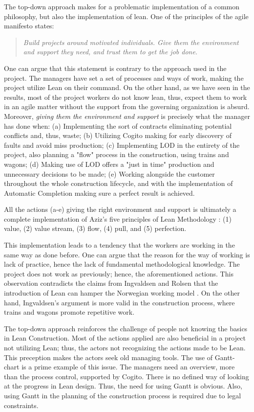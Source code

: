 The top-down approach makes for a problematic implementation of a common philosophy, but also the implementation of lean. One of the principles of the agile manifesto \citep{agile_manifesto} states:

\begin{quote}
    \textit{Build projects around motivated individuals. Give them the environment and support they need, and trust them to get the job done.}
\end{quote}
    
One can argue that this statement is contrary to the approach used in the project. The managers have set a set of processes and ways of work, making the project utilize Lean on their command.  On the other hand, as we have seen in the results, most of the project workers do not know lean, thus, expect them to work in an agile matter without the support from the governing organization is absurd. Moreover, \textit{giving them the environment and support} is precisely what the manager has done when: (a) Implementing the sort of contracts eliminating potential conflicts and, thus, waste; (b) Utilizing Cogito making for early discovery of faults and avoid miss production; (c) Implementing LOD in the entirety of the project, also planning a "flow" process in the construction, using trains and wagons; (d) Making use of LOD offers a "just in time" production and unnecessary decisions to be made; (e) Working alongside the customer throughout the whole construction lifecycle, and with the implementation of Automatic Completion making sure a perfect result is achieved. 

All the actions (a-e) giving the right environment and support is ultimately a complete implementation of Aziz's five principles of Lean Methodology \citep{aziz2013applying}: (1) value, (2) value stream, (3) flow, (4) pull, and (5) perfection. 

This implementation leads to a tendency that the workers are working in the same way as done before. One can argue that the reason for the way of working is lack of practice, hence the lack of fundamental methodological knowledge. The project does not work as previously; hence, the aforementioned actions. This observation contradicts the claims from Ingvaldsen and Rolsen that the introduction of Lean can hamper the Norwegian working model \citep{ingvaldsen2012lean}. On the other hand, Ingvaldsen's argument is more valid in the construction process, where trains and wagons promote repetitive work.

The top-down approach reinforces the challenge of people not knowing the basics in Lean Construction. Most of the actions applied are also beneficial in a project not utilizing Lean; thus, the actors not recognizing the actions made to be Lean. This preception makes the actors seek old managing tools. The use of Gantt-chart is a prime example of this issue. The managers need an overview, more than the process control, supported by Cogito. There is no defined way of looking at the progress in Lean design. Thus, the need for using Gantt is obvious. Also, using Gantt in the planning of the construction process is required due to legal constraints. 

